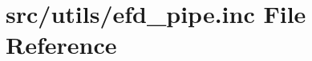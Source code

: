 \hypertarget{efd__pipe_8inc}{}\section{src/utils/efd\+\_\+pipe.inc File Reference}
\label{efd__pipe_8inc}
